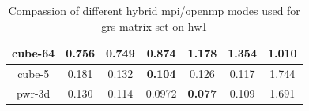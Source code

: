 \begin{table}[h!]
\begin{tabular}{|c|c|c|c|c|c|c|}
cube-64                                               & 0.756                                                     & \textbf{0.749}                                             & 0.874                                                     & 1.178                                                      & 1.354                                                      & 1.010                                                            \\ \hline
cube-5                                                & 0.181                                                     & 0.132                                                      & \textbf{0.104}                                            & 0.126                                                      & 0.117                                                      & 1.744                                                            \\ \hline
pwr-3d                                                & 0.130                                                     & 0.114                                                      & 0.0972                                                    & \textbf{0.077}                                             & 0.109                                                      & 1.691                                                            \\ \hline
\end{tabular}
\caption{Compassion of different hybrid \gls{mpi}/\gls{openmp} modes used for \gls{grs} matrix set on \gls{hw1}}
\label{fig:mpi-omp-grs-hw1}
\end{table}




